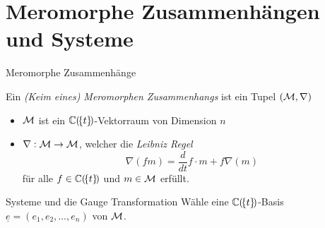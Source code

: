 \section{Meromorphe Zusammenhängen und Systeme}
\begin{frame}{Meromorphe Zusammenhänge}
  \begin{defn}
    Ein \emph{(Keim eines) Meromorphen Zusammenhangs} ist ein Tupel
    $(\mathcal{M},\nabla)$
    \begin{itemize}
    \item<2-> $\mathcal{M}$ ist ein $\mathbb{C}(\!\{t\}\!)$-Vektorraum von Dimension $n$
    \item<3-> $\nabla:\mathcal{M}\to \mathcal{M}$, welcher die \emph{Leibniz Regel}
      \[
        \nabla(fm)=\frac{d}{dt} f \cdot m + f \nabla(m)
      \]
      für alle $f\in\mathbb{C}(\!\{t\}\!)$ und $m\in\mathcal{M}$ erfüllt.
    \end{itemize}
  \end{defn}
\end{frame}
\begin{frame}{Systeme und die Gauge Transformation}
  Wähle eine $\mathbb{C}(\!\{t\}\!)$-Basis $\underline{e}=(e_1,e_2,\dots,e_n)$ von
  $\mathcal{M}$.


\end{frame}

